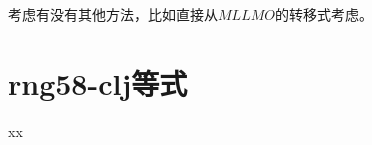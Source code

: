 


\begin{note}
	考虑有没有其他方法，比如直接从$MLLMO$的转移式考虑。
\end{note}

\section{rng58-clj等式}


\vbox{}

\vbox{}

\begin{problemset}
	\item xx
\end{problemset}